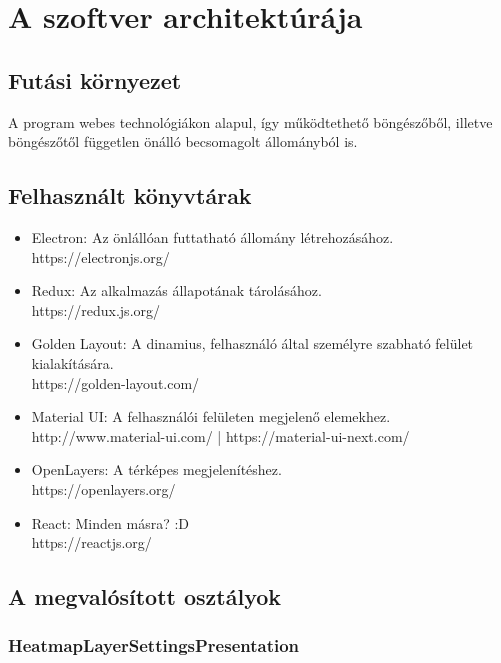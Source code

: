 \section{A szoftver architektúrája}

\subsection{Futási környezet}

A program webes technológiákon alapul, így működtethető böngészőből, illetve böngészőtől független önálló becsomagolt állományból is.

\subsection{Felhasznált könyvtárak}

\begin{itemize}
  \item Electron: Az önlállóan futtatható állomány létrehozásához. \\
  https://electronjs.org/

  \item Redux: Az alkalmazás állapotának tárolásához. \\
  https://redux.js.org/

  \item Golden Layout: A dinamius, felhasználó által személyre szabható felület kialakítására. \\
  https://golden-layout.com/

  \item Material UI: A felhasználói felületen megjelenő elemekhez. \\
  http://www.material-ui.com/ |  https://material-ui-next.com/

  \item OpenLayers: A térképes megjelenítéshez. \\
  https://openlayers.org/

  \item React: Minden másra? :D \\
  https://reactjs.org/
\end{itemize}

\subsection{A megvalósított osztályok}

\subsubsection{HeatmapLayerSettingsPresentation}
